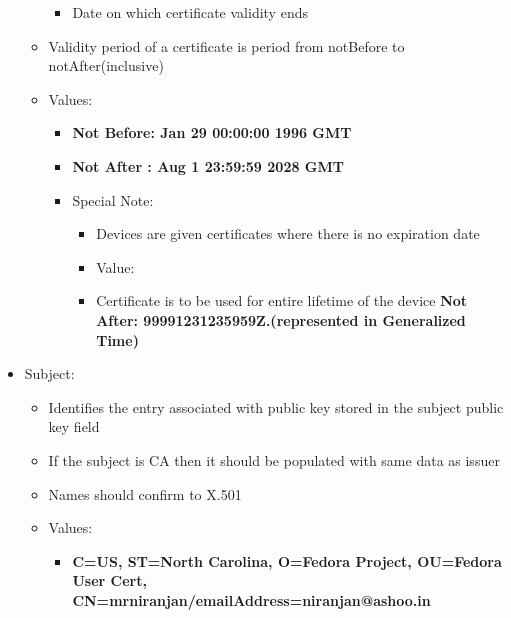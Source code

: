 \documentclass[a4paper]{article}
\begin{document}
\begin{itemize}
\begin{itemize}
\begin{itemize}
                            \item Date on which certificate validity ends
                        \end{itemize}
                    \item Validity period of a certificate is period from notBefore to notAfter(inclusive)
                    \item Values:
                        \begin{itemize}
                            \item \textbf{Not Before: Jan 29 00:00:00 1996 GMT}
                            \item \textbf{Not After : Aug  1 23:59:59 2028 GMT}
                            \item Special Note:
                                \begin{itemize}
                                    \item Devices are given certificates where there is no expiration date
                                    \item Value:
                                    \item Certificate is to be used for entire lifetime of the device \textbf{ Not After: 99991231235959Z.(represented in Generalized Time)}
                                \end{itemize}
                        \end{itemize}
                    \end{itemize}
            \item Subject:
                \begin{itemize}
                    \item Identifies the entry associated with public key stored in the subject public key field 
                    \item If the subject is CA then it should be populated with same data as issuer 
                    \item Names should confirm to X.501
                    \item Values:
                        \begin{itemize}
                            \item \textbf{C=US, ST=North Carolina, O=Fedora Project, OU=Fedora User Cert, CN=mrniranjan/emailAddress=niranjan@ashoo.in}
                        \end{itemize}
                \end{itemize}

\end{itemize}
\end{document}

